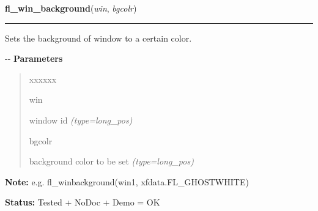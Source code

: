 \hspace{.8\funcindent}\begin{boxedminipage}{\funcwidth}

    \raggedright \textbf{fl\_win\_background}(\textit{win}, \textit{bgcolr})

    \vspace{-1.5ex}

    \rule{\textwidth}{0.5\fboxrule}
\setlength{\parskip}{2ex}

Sets the background of window to a certain color.

-{}-
\setlength{\parskip}{1ex}
      \textbf{Parameters}
      \vspace{-1ex}

      \begin{quote}
        \begin{Ventry}{xxxxxx}

          \item[win]


window id
            {\it (type=long\_pos)}

          \item[bgcolr]


background color to be set
            {\it (type=long\_pos)}

        \end{Ventry}

      \end{quote}

\textbf{Note:} 
e.g. fl\_winbackground(win1, xfdata.FL\_GHOSTWHITE)


\textbf{Status:} 
Tested + NoDoc + Demo = OK


    \end{boxedminipage}

    \label{xformslib:flxbasic:fl_winstepsize}

    \vspace{0.5ex}

